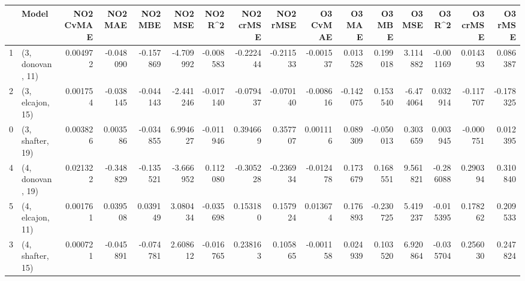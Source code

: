 \begin{tabular}{llrrrrrrrrrrrrrr}
\toprule
{} &             Model &  NO2 CvMAE &   NO2 MAE &   NO2 MBE &   NO2 MSE &   NO2 R\textasciicircum2 &  NO2 crMSE &  NO2 rMSE &  O3 CvMAE &    O3 MAE &    O3 MBE &    O3 MSE &    O3 R\textasciicircum2 &  O3 crMSE &   O3 rMSE \\
\midrule
1 &  (3, donovan, 11) &   0.004972 & -0.048090 & -0.157869 & -4.709992 & -0.008583 &  -0.222444 & -0.211533 & -0.001537 &  0.013528 &  0.199018 &  3.114882 & -0.001169 &  0.014393 &  0.086387 \\
2 &  (3, elcajon, 15) &   0.001754 & -0.038145 & -0.044143 & -2.441246 & -0.017140 &  -0.079437 & -0.070140 & -0.008616 & -0.142075 &  0.153540 & -6.474064 &  0.032914 & -0.117707 & -0.178325 \\
0 &  (3, shafter, 19) &   0.003826 &  0.003586 & -0.034855 &  6.994627 & -0.011946 &   0.394669 &  0.357707 &  0.001116 &  0.089309 & -0.050013 &  0.303659 &  0.003945 & -0.000751 &  0.012395 \\
4 &  (4, donovan, 19) &   0.021322 & -0.348829 & -0.135521 & -3.666952 &  0.112080 &  -0.305228 & -0.236934 & -0.012478 &  0.173679 &  0.168551 &  9.561821 & -0.286088 &  0.290394 &  0.310840 \\
5 &  (4, elcajon, 11) &   0.001761 &  0.039508 &  0.039149 &  3.080434 & -0.035698 &   0.153180 &  0.157924 &  0.013674 &  0.176893 & -0.230725 &  5.419237 & -0.015395 &  0.178262 &  0.209533 \\
3 &  (4, shafter, 15) &   0.000721 & -0.045891 & -0.074781 &  2.608612 & -0.016765 &   0.238163 &  0.105865 & -0.001158 &  0.024939 &  0.103520 &  6.920864 & -0.035704 &  0.256030 &  0.247824 \\
\bottomrule
\end{tabular}
